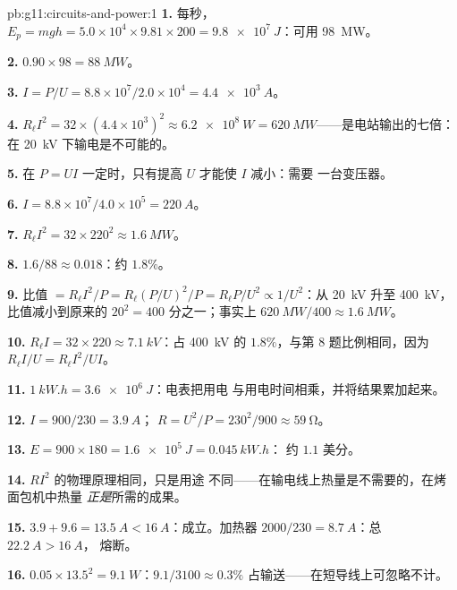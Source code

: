 \begin{solution}{pb:g11:circuits-and-power:1}
\textbf{1.} 每秒，$E_p = mgh = 5.0\times10^{4} \times 9.81 \times
200 = \qty{9.8e7}{J}$：可用 \qty{98}{MW}。

\textbf{2.} $0.90 \times 98 = \qty{88}{MW}$。

\textbf{3.} $I = P/U = 8.8\times10^{7}/2.0\times10^{4} = \qty{4.4e3}{A}$。

\textbf{4.} $R_\ell I^2 = 32 \times (4.4\times10^{3})^2 \approx
\qty{6.2e8}{W} = \qty{620}{MW}$——是电站输出的七倍：
在 \qty{20}{kV} 下输电是不可能的。

\textbf{5.} 在 $P = UI$ 一定时，只有提高 $U$ 才能使 $I$ 减小：需要
一台变压器。

\textbf{6.} $I = 8.8\times10^{7}/4.0\times10^{5} = \qty{220}{A}$。

\textbf{7.} $R_\ell I^2 = 32 \times 220^2 \approx \qty{1.6}{MW}$。

\textbf{8.} $1.6/88 \approx 0.018$：约 $1.8\%$。

\textbf{9.} 比值 $= R_\ell I^2/P = R_\ell (P/U)^2/P = R_\ell P/U^2
\propto 1/U^2$：从 \qty{20}{kV} 升至 \qty{400}{kV}，比值减小到原来的
$20^2 = 400$ 分之一；事实上 $\qty{620}{MW}/400 \approx \qty{1.6}{MW}$。

\textbf{10.} $R_\ell I = 32 \times 220 \approx \qty{7.1}{kV}$：占
\qty{400}{kV} 的 $1.8\%$，与第 8 题比例相同，因为
$R_\ell I/U = R_\ell I^2/UI$。

\textbf{11.} $\qty{1}{kW.h} = \qty{3.6e6}{J}$：电表把用电
与用电时间相乘，并将结果累加起来。

\textbf{12.} $I = 900/230 = \qty{3.9}{A}$；
$R = U^2/P = 230^2/900 \approx \qty{59}{\ohm}$。

\textbf{13.} $E = 900 \times 180 = \qty{1.6e5}{J} = \qty{0.045}{kW.h}$：
约 $1.1$ 美分。

\textbf{14.} $RI^2$ 的物理原理相同，只是用途
不同——在输电线上热量是不需要的，在烤面包机中热量
\emph{正是}所需的成果。

\textbf{15.} $3.9 + 9.6 = \qty{13.5}{A} < \qty{16}{A}$：成立。加热器
$2000/230 = \qty{8.7}{A}$：总 $\qty{22.2}{A} > \qty{16}{A}$，
熔断。

\textbf{16.} $0.05 \times 13.5^2 = \qty{9.1}{W}$：$9.1/3100 \approx
0.3\%$ 占输送——在短导线上可忽略不计。


\end{solution}
